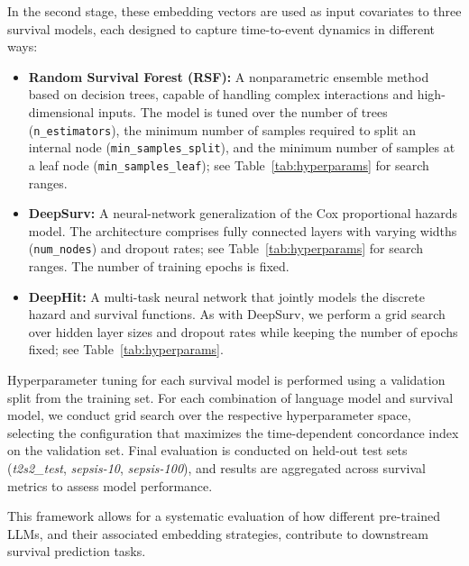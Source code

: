 In the second stage, these embedding vectors are used as input covariates to three survival models, each designed to capture time-to-event dynamics in different ways:

\begin{itemize}
    \item \textbf{Random Survival Forest (RSF):} 
    A nonparametric ensemble method based on decision trees, capable of handling complex interactions and high-dimensional inputs. 
    The model is tuned over the number of trees (\texttt{n\_estimators}), the minimum number of samples required to split an internal node (\texttt{min\_samples\_split}), and the minimum number of samples at a leaf node (\texttt{min\_samples\_leaf}); see Table~\ref{tab:hyperparams} for search ranges.

    \item \textbf{DeepSurv:} 
    A neural-network generalization of the Cox proportional hazards model. 
    The architecture comprises fully connected layers with varying widths (\texttt{num\_nodes}) and dropout rates; see Table~\ref{tab:hyperparams} for search ranges. The number of training epochs is fixed.

    \item \textbf{DeepHit:} 
    A multi-task neural network that jointly models the discrete hazard and survival functions. 
    As with DeepSurv, we perform a grid search over hidden layer sizes and dropout rates while keeping the number of epochs fixed; see Table~\ref{tab:hyperparams}.
\end{itemize}

Hyperparameter tuning for each survival model is performed using a validation split from the training set. 
For each combination of language model and survival model, we conduct grid search over the respective hyperparameter space, selecting the configuration that maximizes the time-dependent concordance index \citep{antolini2005time} on the validation set. 
Final evaluation is conducted on held-out test sets (\textit{t2s2\_test}, \textit{sepsis-10}, \textit{sepsis-100}), and results are aggregated across survival metrics to assess model performance.

This framework allows for a systematic evaluation of how different pre-trained LLMs, and their associated embedding strategies, contribute to downstream survival prediction tasks.


